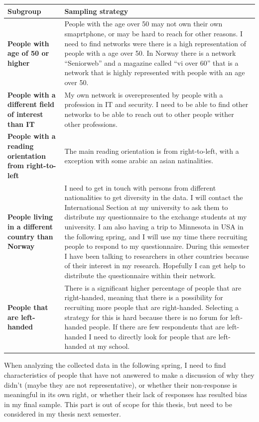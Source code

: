     \begin{tabular}{| p{4cm} | p{7cm} |}
      \hline
      {\bf Subgroup} & {\bf Sampling strategy} \\ \hline
      {\bf People with age of 50 or higher} & People with the age over 50 may not own their own smaprtphone, or may be hard to reach for other reasons. I need to find networks were there is a high representation of people with a age over 50. In Norway there is a network ``Seniorweb'' and a magazine called ``vi over 60'' that is a network that is highly represented with people with an age over 50. \\ \hline
      {\bf People with a different field of interest than IT} & My own network is overepresented by people with a profession in IT and security. I need to be able to find other networks to be able to reach out to other people wither other professions. \\ \hline
      {\bf People with a reading orientation from right-to-left} & The main reading orientation is from right-to-left, with a exception with some arabic an asian natinalities. \\ \hline
      {\bf People living in a different country than Norway} & I need to get in touch with persons from different nationalities to get diversity in the data. I will contact the International Section at my university to ask them to distribute my questionnaire to the exchange students at my university. I am also having a trip to Minnesota in USA in the following spring, and I will use my time there recruiting people to respond to my questionnaire. During this semester I have been talking to researchers in other countries because of their interest in my research. Hopefully I can get help to distribute the questionnaire within their network. \\ \hline
      {\bf People that are left-handed} & There is a significant higher percentage of people that are right-handed, meaning that there is a possibility for recruiting more people that are right-handed. Selecting a strategy for this is hard because there is no forum for left-handed people. If there are few respondents that are left-handed I need to directly look for people that are left-handed at my school.\\ \hline
    \end{tabular}

    When analyzing the collected data in the following spring, I need to find characteristics of people that have not answered to make a discussion of why they didn't (maybe they are not representative), or whether their non-response is meaningful in its own right, or whether their lack of responses has resulted bias in my final sample. This part is out of scope for this thesis, but need to be considered in my thesis next semester.
  

